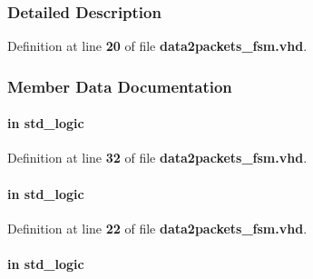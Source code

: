 \subsubsection{Detailed Description}


Definition at line {\bf 20} of file {\bf data2packets\+\_\+fsm.\+vhd}.



\subsubsection{Member Data Documentation}
\paragraph[{chirp\+\_\+sync\+\_\+en}]{ {\bfseries \textcolor{keywordflow}{in}\textcolor{vhdlchar}{ }} {\bfseries \textcolor{comment}{std\+\_\+logic}\textcolor{vhdlchar}{ }} \hspace{0.3cm}{\ttfamily [Port]}}\label{classdata2packets__fsm_a2eb0dd53d4912cecebab02d114ed6707}


Definition at line {\bf 32} of file {\bf data2packets\+\_\+fsm.\+vhd}.

\paragraph[{clk}]{ {\bfseries \textcolor{keywordflow}{in}\textcolor{vhdlchar}{ }} {\bfseries \textcolor{comment}{std\+\_\+logic}\textcolor{vhdlchar}{ }} \hspace{0.3cm}{\ttfamily [Port]}}\label{classdata2packets__fsm_a4a4609c199d30b3adebbeb3a01276ec5}


Definition at line {\bf 22} of file {\bf data2packets\+\_\+fsm.\+vhd}.

\paragraph[{data2packets\+\_\+done}]{ {\bfseries \textcolor{keywordflow}{in}\textcolor{vhdlchar}{ }} {\bfseries \textcolor{comment}{std\+\_\+logic}\textcolor{vhdlchar}{ }} \hspace{0.3cm}{\ttfamily [Port]}}\label{classdata2packets__fsm_a029a256d1e664eaab139fc53e0fdfc15}


